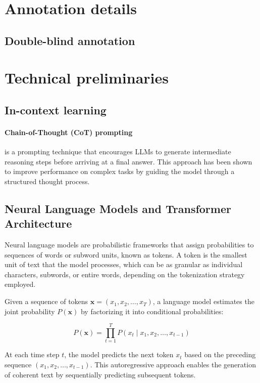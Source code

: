 \documentclass[11pt]{article}
\begin{document}
\section{Annotation details} \label{app:annotation}

\subsection{Double-blind annotation}

\section{Technical preliminaries} \label{app:technicality}

\subsection{In-context learning}

\paragraph{Chain-of-Thought (CoT) prompting} \citep{weiChainofThoughtPromptingElicits2023} is a prompting technique that encourages LLMs to generate intermediate reasoning steps before arriving at a final answer. This approach has been shown to improve performance on complex tasks by guiding the model through a structured thought process.

\subsection{Neural Language Models and Transformer Architecture} \label{app:llm-transformer}

Neural language models are probabilistic frameworks that assign probabilities to sequences of words or subword units, known as tokens. A token is the smallest unit of text that the model processes, which can be as granular as individual characters, subwords, or entire words, depending on the tokenization strategy employed.

Given a sequence of tokens \( \mathbf{x} = (x_1, x_2, \ldots, x_T) \), a language model estimates the joint probability \( P(\mathbf{x}) \) by factorizing it into conditional probabilities:

\[
P(\mathbf{x}) = \prod_{t=1}^T P(x_t \mid x_1, x_2, \ldots, x_{t-1})
\]

At each time step \( t \), the model predicts the next token \( x_t \) based on the preceding sequence \( (x_1, x_2, \ldots, x_{t-1}) \). This autoregressive approach enables the generation of coherent text by sequentially predicting subsequent tokens.
\end{document}
